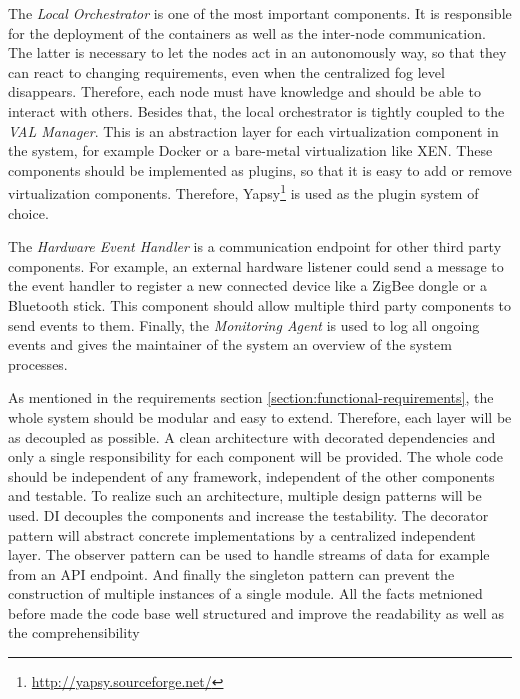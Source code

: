 The \textit{Local Orchestrator} is one of the most important components.
It is responsible for the deployment of the containers as well as the inter-node communication.
The latter is necessary to let the nodes act in an autonomously way, so that they can react to changing requirements, even when the centralized fog level disappears.
Therefore, each node must have knowledge and should be able to interact with others.
Besides that, the local orchestrator is tightly coupled to the \textit{\ac{VAL} Manager}.
This is an abstraction layer for each virtualization component in the system, for example Docker or a bare-metal virtualization like XEN.
These components should be implemented as plugins, so that it is easy to add or remove virtualization components.
Therefore, Yapsy\footnote{\url{http://yapsy.sourceforge.net/}} is used as the plugin system of choice.

The \textit{Hardware Event Handler} is a communication endpoint for other third party components.
For example, an external hardware listener could send a message to the event handler to register a new connected device like a ZigBee dongle or a Bluetooth stick.
This component should allow multiple third party components to send events to them.
Finally, the \textit{Monitoring Agent} is used to log all ongoing events and gives the maintainer of the system an overview of the system processes.

As mentioned in the requirements section \ref{section:functional-requirements}, the whole system should be modular and easy to extend.
Therefore, each layer will be as decoupled as possible.
A clean architecture with decorated dependencies and only a single responsibility for each component will be provided.
The whole code should be independent of any framework, independent of the other components and testable.
To realize such an architecture, multiple design patterns will be used.
\ac{DI} decouples the components and increase the testability.
The decorator pattern will abstract concrete implementations by a centralized independent layer.
The observer pattern can be used to handle streams of data for example from an \ac{API} endpoint.
And finally the singleton pattern can prevent the construction of multiple instances of a single module.
All the facts metnioned before made the code base well structured and improve the readability as well as the comprehensibility


